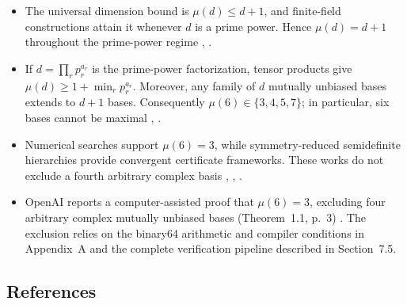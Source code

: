 \begin{itemize}
  \item The universal dimension bound is $\mu(d)\leq d+1$, and finite-field
  constructions attain it whenever $d$ is a prime power.  Hence
  $\mu(d)=d+1$ throughout the prime-power regime
  ,
  .

  \item If $d=\prod_r p_r^{a_r}$ is the prime-power factorization, tensor
  products give $\mu(d)\geq1+\min_r p_r^{a_r}$.  Moreover, any family of $d$
  mutually unbiased bases extends to $d+1$ bases.  Consequently
  $\mu(6)\in\{3,4,5,7\}$; in particular, six bases cannot be maximal
  ,
  .

  \item Numerical searches support $\mu(6)=3$, while symmetry-reduced
  semidefinite hierarchies provide convergent certificate frameworks.
  These works do not exclude a fourth arbitrary complex basis
  ,
  ,
  .

  \item OpenAI reports a computer-assisted proof that $\mu(6)=3$, excluding
  four arbitrary complex mutually unbiased bases (Theorem~1.1, p.~3)
  . The exclusion relies on
  the binary64 arithmetic and compiler conditions in Appendix~A and the
  complete verification pipeline described in Section~7.5.
\end{itemize}

\subsection*{References}

